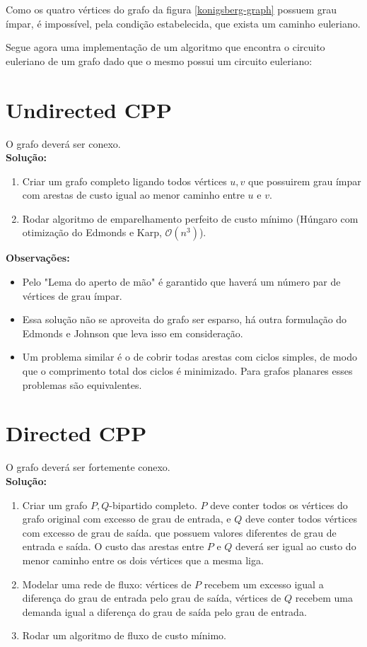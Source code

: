 \documentclass{article}
\begin{document}
Como os quatro vértices do grafo da figura \ref{konigsberg-graph} possuem grau ímpar, é impossível, pela condição estabelecida, que exista um caminho euleriano.


Segue agora uma implementação de um algoritmo que encontra o circuito euleriano de um grafo dado que o mesmo possui um circuito euleriano:


 

\section{Undirected CPP}

O grafo deverá ser conexo.
\\

\textbf{Solução:} 
\begin{enumerate}
    \item Criar um grafo completo ligando todos vértices $u, v$ que possuirem grau ímpar com arestas de custo igual ao menor caminho entre $u$ e $v$. 
    \item Rodar algoritmo de emparelhamento perfeito de custo mínimo (Húngaro com otimização do Edmonds e Karp, $\mathcal{O}(n^3)$).
\end{enumerate}


\textbf{Observações:}
\begin{itemize}
    \item Pelo "Lema do aperto de mão" é garantido que haverá um número par de vértices de grau ímpar.
    \item Essa solução não se aproveita do grafo ser esparso, há outra formulação do Edmonds e Johnson que leva isso em consideração.
    \item Um problema similar é o de cobrir todas arestas com ciclos simples, de modo que o comprimento total dos ciclos é minimizado. Para grafos planares esses problemas são equivalentes.
\end{itemize}

\section{Directed CPP}

O grafo deverá ser fortemente conexo.\\

\textbf{Solução:}
\begin{enumerate}
    \item Criar um grafo $P, Q$-bipartido completo. $P$ deve conter todos os vértices do grafo original com excesso de grau de entrada, e $Q$ deve conter todos vértices com excesso de grau de saída. que possuem valores diferentes de grau de entrada e saída. O custo das arestas entre $P$ e $Q$ deverá ser igual ao custo do menor caminho entre os dois vértices que a mesma liga.
    \item Modelar uma rede de fluxo: vértices de $P$ recebem um excesso igual a diferença do grau de entrada pelo grau de saída, vértices de $Q$ recebem uma demanda igual a diferença do grau de saída pelo grau de entrada. 
    \item Rodar um algoritmo de fluxo de custo mínimo. 
\end{enumerate}
\end{document}
